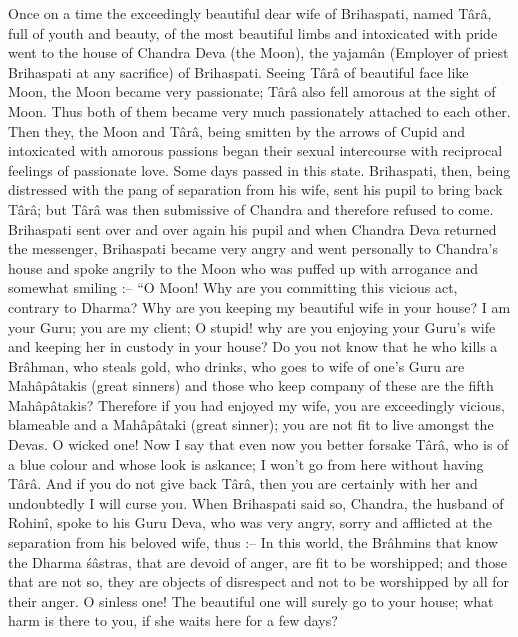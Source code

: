 Once on a time the exceedingly beautiful dear wife of Brihaspati, named T\^ar\^a, full of youth and beauty, of the most beautiful limbs and intoxicated with pride went to the house of Chandra Deva (the Moon), the yajam\^an (Employer of priest Brihaspati at any sacrifice) of Brihaspati. Seeing T\^ar\^a of beautiful face like Moon, the Moon became very passionate; T\^ar\^a also fell amorous at the sight of Moon. Thus both of them became very much passionately attached to each other. Then they, the Moon and T\^ar\^a, being smitten by the arrows of Cupid and intoxicated with amorous passions began their sexual intercourse with reciprocal feelings of passionate love. Some days passed in this state. Brihaspati, then, being distressed with the pang of separation from his wife, sent his pupil to bring back T\^ar\^a; but T\^ar\^a was then submissive of Chandra and therefore refused to come. Brihaspati sent over and over again his pupil and when Chandra Deva returned the messenger, Brihaspati became very angry and went personally to Chandra's house and spoke angrily to the Moon who was puffed up with arrogance and somewhat smiling :-- ``O Moon! Why are you committing this vicious act, contrary to Dharma? Why are you keeping my beautiful wife in your house? I am your Guru; you are my client; O stupid! why are you enjoying your Guru's wife and keeping her in custody in your house? Do you not know that he who kills a Br\^ahman, who steals gold, who drinks, who goes to wife of one's Guru are Mah\^ap\^atakis (great sinners) and those who keep company of these are the fifth Mah\^ap\^atakis? Therefore if you had enjoyed my wife, you are exceedingly vicious, blameable and a Mah\^ap\^ataki (great sinner); you are not fit to live amongst the Devas. O wicked one! Now I say that even now you better forsake T\^ar\^a, who is of a blue colour and whose look is askance; I won't go from here without having T\^ar\^a. And if you do not give back T\^ar\^a, then you are certainly with her and undoubtedly I will curse you. When Brihaspati said so, Chandra, the husband of Rohin\^i, spoke to his Guru Deva, who was very angry, sorry and afflicted at the separation from his beloved wife, thus :-- In this world, the Br\^ahmins that know the Dharma \'s\^astras, that are devoid of anger, are fit to be worshipped; and those that are not so, they are objects of disrespect and not to be worshipped by all for their anger. O sinless one! The beautiful one will surely go to your house; what harm is there to you, if she waits here for a few days?

